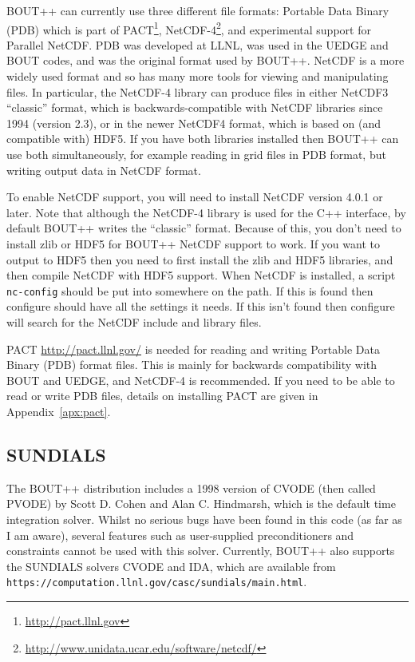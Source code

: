 \documentclass[12pt]{article}
\newcommand{\code}[1]{\texttt{#1}}
\begin{document}
BOUT++ can currently use three different file formats: Portable Data Binary
(PDB) which is part of PACT\footnote{\url{http://pact.llnl.gov}}, 
NetCDF-4\footnote{\url{http://www.unidata.ucar.edu/software/netcdf/}},
and experimental support for Parallel NetCDF.
PDB was developed at LLNL, was used in the UEDGE and BOUT codes, and 
was the original format used by BOUT++. NetCDF is a more widely used
format and so has many more tools for viewing and manipulating files.
In particular, the NetCDF-4 library can produce files in either
NetCDF3 ``classic'' format, which is backwards-compatible with NetCDF
libraries since 1994 (version 2.3), or in the newer NetCDF4 format, 
which is based on (and compatible with) HDF5. If you have both libraries
installed then BOUT++ can use both simultaneously, for example reading in
grid files in PDB format, but writing output data in NetCDF format. 

To enable NetCDF support, you will need to install NetCDF version 4.0.1 or later. 
Note that although the NetCDF-4 library is used for the C++ interface, by default
BOUT++ writes the ``classic'' format. Because of this, you don't need to install zlib or HDF5
for BOUT++ NetCDF support to work.  If you want to output to HDF5 then you need to first install
  the zlib and HDF5 libraries, and then compile NetCDF with HDF5 support. 
When NetCDF is installed, a script \texttt{nc-config}
should be put into somewhere on the path. If this is found then configure
should have all the settings it needs. If this isn't found then configure
will search for the NetCDF include and library files. 

PACT \url{http://pact.llnl.gov/} is needed for reading and writing Portable Data Binary (PDB) format files. This is mainly for backwards compatibility with BOUT and UEDGE, and NetCDF-4 is recommended.
If you need to be able to read or write PDB files, details on installing PACT are given in Appendix~\ref{apx:pact}. 

\subsection{SUNDIALS}

The BOUT++ distribution includes a 1998 version of CVODE (then called PVODE) by Scott D. Cohen and Alan C.
Hindmarsh, which is the default time integration solver. 
Whilst no serious bugs have been found in this code
(as far as I am aware), several features such as user-supplied preconditioners and constraints cannot
be used with this solver. Currently, BOUT++ also supports the SUNDIALS solvers CVODE and
IDA, which are available from \code{https://computation.llnl.gov/casc/sundials/main.html}.
\end{document}
